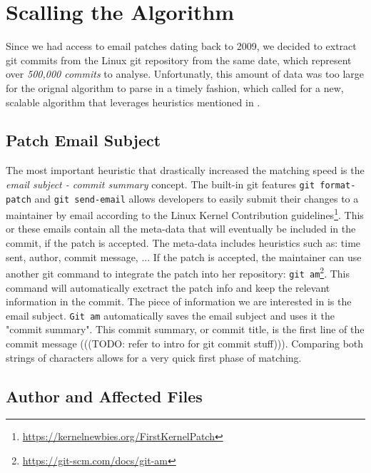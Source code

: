 \section{Scalling the Algorithm}

Since we had access to email patches dating back to 2009, we decided to extract git commits from the Linux git repository from the same date, which represent over \textit{500,000 commits} to analyse. Unfortunatly, this amount of data was too large for the orignal algorithm to parse in a timely fashion, which called for a new, scalable algorithm that leverages heuristics mentioned in \citep{msr13jojo,jiang14}.

\subsection{Patch Email Subject}

The most important heuristic that drastically increased the matching speed is the \textit{email subject - commit summary} concept. The built-in git features \texttt{git format-patch} and \texttt{git send-email} allows developers to easily submit their changes to a maintainer by email according to the Linux Kernel Contribution guidelines\footnote{\url{https://kernelnewbies.org/FirstKernelPatch}}. This or these emails contain all the meta-data that will eventually be included in the commit, if the patch is accepted. The meta-data includes heuristics such as: time sent, author, commit message, ... If the patch is accepted, the maintainer can use another git command to integrate the patch into her repository: \texttt{git am}\footnote{\url{https://git-scm.com/docs/git-am}}. This command will automatically exctract the patch info and keep the relevant information in the commit. The piece of information we are interested in is the email subject. \texttt{Git am} automatically saves the email subject and uses it the "commit summary". This commit summary, or commit title, is the first line of the commit message (((TODO: refer to intro for git commit stuff))). Comparing both strings of characters allows for a very quick first phase of matching.



\subsection{Author and Affected Files}

